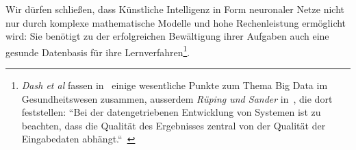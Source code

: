 Wir dürfen schließen, dass Künstliche Intelligenz in Form neuronaler Netze nicht nur durch komplexe mathematische Modelle und hohe Rechenleistung ermöglicht wird: Sie benötigt zu der erfolgreichen Bewältigung ihrer Aufgaben auch eine gesunde Datenbasis für ihre Lernverfahren\footnote{
    \textit{Dash et al} fassen in~\cite{SSM+19} einige wesentliche Punkte zum Thema Big Data im Gesundheitswesen zusammen, ausserdem \textit{Rüping und Sander} in~\cite{RS19}, die dort feststellen: ``Bei der datengetriebenen Entwicklung von Systemen ist zu beachten, dass die Qualität des Ergebnisses zentral von der Qualität der Eingabedaten abhängt.``~\cite[19]{RS19}
}.













%
%
%
%

